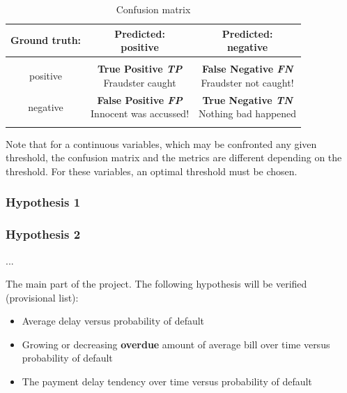 \documentclass{article}
\begin{document}
\begin{table}[!htbp]
    \centering
    \caption{Confusion matrix}
    \label{tab:305_confusion_matrix}
    \begin{tabular}{c c c}
    \\ \hline\hline
    Ground truth: & \makecell{Predicted:\\positive} & \makecell{Predicted:\\negative} \\
    \hline \\
    positive & \makecell{\textbf{True Positive \textit{TP}} \\ Fraudster caught} & \makecell{\textbf{False Negative \textit{FN}} \\ Fraudster not caught!}\\
    negative & \makecell{\textbf{False Positive \textit{FP}} \\ Innocent was accussed!} & \makecell{\textbf{True Negative \textit{TN}} \\ Nothing bad happened}\\
    \hline\hline \\
    \end{tabular}
\end{table}


\par Note that for a continuous variables, which may be confronted any given threshold, the confusion matrix and the metrics are different depending on the threshold.
For these variables, an optimal threshold must be chosen.

\subsubsection{Hypothesis 1}
\subsubsection{Hypothesis 2}
...


The main part of the project. The following hypothesis will be verified (provisional list):
\begin{itemize}
    \item Average delay versus probability of default
    \item Growing or decreasing \textbf{overdue} amount of average bill over time versus probability of default
    \item The payment delay tendency over time versus probability of default
\end{itemize}
\end{document}
